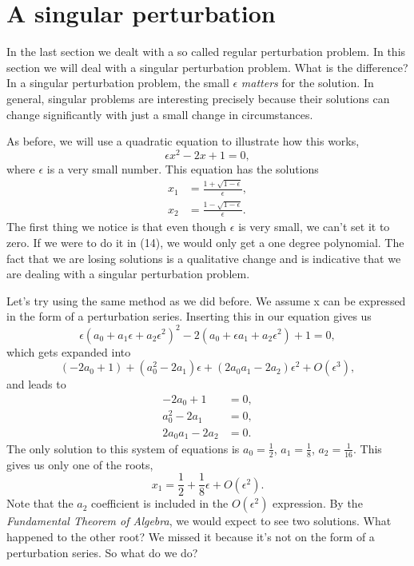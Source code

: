 \documentclass[12pt]{article}
\begin{document}
\newpage
\section{A singular perturbation}

In the last section we dealt with a so called regular perturbation
problem. In this section we will deal with a singular perturbation
problem. What is the difference? In a singular perturbation problem,
the small $\epsilon$ \textit{matters} for the solution. In general,
singular problems are interesting precisely because their solutions
can change significantly with just a small change in circumstances.

As before, we will use a quadratic equation to illustrate how this
works,
\begin{equation}
\epsilon x^2 - 2 x + 1 = 0,
\end{equation}
where $\epsilon$ is a very small number. This equation has the
solutions
\begin{align}
x_1 &= \frac{1 + \sqrt{1 - \epsilon}}{\epsilon}, \\
x_2 &= \frac{1 - \sqrt{1 - \epsilon}}{\epsilon}.
\end{align}
The first thing we notice is that even though $\epsilon$ is very
small, we can't set it to zero. If we were to do it in (14), we would
only get a one degree polynomial. The fact that we are losing
solutions is a qualitative change and is indicative that we are
dealing with a singular perturbation problem.

Let's try using the same method as we did before. We assume x can be
expressed in the form of a perturbation series. Inserting this in our
equation gives us
\begin{equation}
\epsilon (a_0 + a_1 \epsilon + a_2 \epsilon^2)^2 - 2(a_0 + \epsilon a_1 +
a_2 \epsilon^2) + 1 = 0,
\end{equation}
which gets expanded into
\begin{equation}
(- 2 a_0 + 1) + (a_0^2 - 2 a_1) \epsilon + (2 a_0 a_1 -2 a_2) \epsilon^2 +
O(\epsilon^3),
\end{equation}
and leads to
\begin{align}
- 2 a_0 + 1 &= 0, \\
a_0^2 - 2 a_1 &= 0, \\
2 a_0 a_1 -2 a_2 &= 0.
\end{align}
The only solution to this system of equations is $a_0 = \frac{1}{2}$,
$a_1=\frac{1}{8}$, $a_2 = \frac{1}{16}$. This gives us only one of the
roots,
\begin{equation}
x_1 = \frac{1}{2} + \frac{1}{8} \epsilon + O(\epsilon^2).
\end{equation}
Note that the $a_2$ coefficient is included in the $O(\epsilon^2)$
expression. By the \textit{Fundamental Theorem of Algebra}, we would
expect to see two solutions. What happened to the other root? We
missed it because it's not on the form of a perturbation series. So
what do we do?
\end{document}
